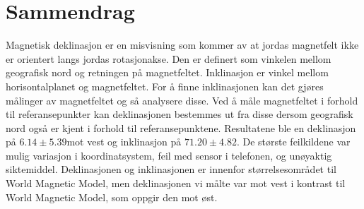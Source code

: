 
\section*{Sammendrag}

Magnetisk deklinasjon er en misvisning som kommer av at jordas magnetfelt ikke er orientert langs jordas 
rotasjonakse. Den er definert som vinkelen mellom geografisk nord og retningen på magnetfeltet. Inklinasjon er vinkel mellom horisontalplanet og magnetfeltet. For å finne inklinasjonen kan 
det gjøres målinger av magnetfeltet og så analysere disse. Ved å måle magnetfeltet i forhold til 
referansepunkter kan 
deklinasjonen bestemmes ut fra disse dersom geografisk nord også er kjent i forhold til referansepunktene. 
Resultatene ble en deklinasjon på $6.14\pm{5.39}$\textdegree mot vest og inklinasjon på 
$71.20\pm{4.82}$\textdegree. De største feilkildene var mulig variasjon i koordinatsystem, feil med sensor i 
telefonen, og unøyaktig siktemiddel. Deklinasjonen og inklinasjonen er innenfor størrelsesområdet til World 
Magnetic Model, men 
deklinasjonen vi målte var mot vest i kontrast til World Magnetic Model, som oppgir den mot øst.


